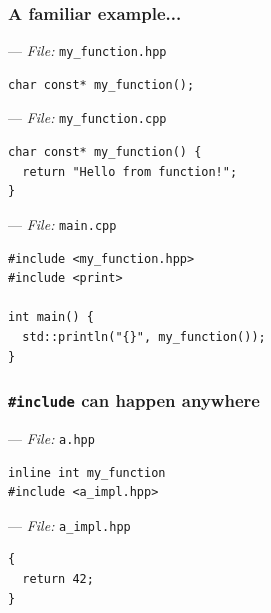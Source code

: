 \documentclass[aspectratio=169]{beamer}
\newif\iftransitions
\newcommand{\cpause}{\iftransitions \pause \fi}
\begin{document}

\begin{frame}[fragile]
  \frametitle{A familiar example...}

  --- \textit{File:} \texttt{my\_function.hpp}
  \begin{lstlisting}[style=cpp20]
char const* my_function();
  \end{lstlisting}

  --- \textit{File:} \texttt{my\_function.cpp}
  \begin{lstlisting}[style=cpp20]
char const* my_function() {
  return "Hello from function!";
}
  \end{lstlisting}

  \cpause
  --- \textit{File:} \texttt{main.cpp}
  \begin{lstlisting}[style=cpp20]
#include <my_function.hpp>
#include <print>

int main() {
  std::println("{}", my_function());
}
  \end{lstlisting}

\end{frame}

\begin{frame}[fragile]
  \frametitle{\texttt{\#include} can happen anywhere}
  --- \textit{File:} \texttt{a.hpp}
  \begin{lstlisting}[style=cpp20]
inline int my_function
#include <a_impl.hpp>
  \end{lstlisting}

  --- \textit{File:} \texttt{a\_impl.hpp}
  \begin{lstlisting}[style=cpp20]
{
  return 42;
}
  \end{lstlisting}

\end{frame}
\end{document}
